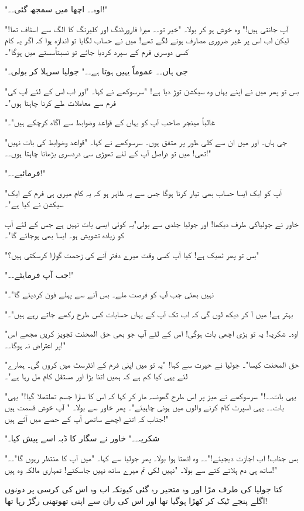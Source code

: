"اوہ۔۔ اچھا میں سمجھ گئی۔۔!"

"آپ جانتی ہیں!" وہ خوش ہو کر بولا۔ "خیر تو۔۔ میرا فارورڈنگ اور کلیرنگ کا الگ سے اسٹاف تھا! لیکن اب اس پر غیر ضروری مصارف ہونے لگے تھے! میں نے حساب لگایا تو اندازہ ہوا کہ اگر یہ کام کسی دوسری فرم کے سپرد کردیا جائے تو نسبتاًسستے میں ہوگا"۔

"جی ہاں۔۔ عموماً یہیں ہوتا ہے۔۔" جولیا سرہلا کر بولی۔

"بس تو پھر میں نے اپنے یہاں وہ سیکشن توڑ دیا ہے! "سرسوکھے نے کہا۔ "اور اب اس کے لئے آپ کی فرم سے معاملات طے کرنا چاہتا ہوں"۔

"غالباً مینجر صاحب آپ کو یہاں کے قواعد وضوابط سے آگاہ کرچکے ہیں"۔

"جی ہاں۔ اور میں ان سے کلی طور پر متفق ہوں۔ سرسوکھے نے کہا۔ "قواعد وضوابط کی بات نہیں تھی! میں تو دراصل آپ کے لئے تھوڑی سی دردسری بڑھانا چاہتا ہوں۔۔!"

"فرمائیے۔۔!"

"آپ کو ایک ایسا حساب بھی تیار کرنا ہوگا جس سے یہ ظاہر ہو کہ یہ کام میری ہی فرم کے ایک سیکشن نے کیا ہے"۔

خاور نے جولیاکی طرف دیکھا! اور جولیا جلدی سے بولی"یہ کوئی ایسی بات نہیں ہے جس کے لئے آپ کو زیادہ تشویش ہو۔ ایسا بھی ہوجائے گا"۔

"بس تو پھر ٹھیک ہے! کیا آپ کسی وقت میرے دفتر آنے کی زحمت گوارا کرسکتی ہیں؟"

"جب آپ فرمایئے۔۔!"

"نہیں بھئی جب آپ کو فرصت ملے۔ بس آنے سے پہلے فون کردیئے گا"۔

"بہتر ہے! میں آ کر دیکھ لوں گی کہ اب تک آپ کے یہاں حسابات کس طرح رکھے جاتے رہے ہیں"۔

"اوہ۔ شکریہ! یہ تو بڑی اچھی بات ہوگی! اس کے لئے آپ جو بھی حق المحنت تجویز کریں مجھے اس پر اعتراض نہ ہوگا۔۔!"

"حق المحنت کیسا"۔ جولیا نے حیرت سے کہا! "یہ تو میں اپنی فرم کے انٹرسٹ میں کروں گی۔ ہمارے لئے یہی کیا کم ہے کہ ہمیں اتنا بڑا اور مستقل کام مل رہا ہے"۔

"یہی بات۔۔!" سرسوکھے نے میز پر اس طرح گھونسہ مار کر کہا کہ اس کا سارا جسم تھلتھلا گیا!" یہی بات۔۔ یہی اسپرٹ کام کرنے والوں میں ہونی چاہیئے"۔ پھر خاور سے بولا۔ " آپ خوش قسمت ہیں جناب کہ اتنے اچھے ساتھی آپ کے حصے میں آئے ہیں!"

"شکریہ۔۔" خاور نے سگار کا ڈبہ اسے پیش کیا۔

"بس جناب! اب اجازت دیجیئے!"۔۔ وہ اٹھتا ہوا بولا۔ پھر جولیا سے کہا۔ "میں آپ کا منتظر رہوں گا"۔۔ ساتھ ہی دم ہلاتے کتے سے بولا۔ "نہیں لکی تم میرے ساتھ نہیں جاسکتے! تمہاری مالکہ وہ ہیں!"

کتا جولیا کی طرف مڑا اور وہ متحیر رہ گئی کیونکہ اب وہ اس کی کرسی پر دونوں اگلے پنجے ٹیک کر کھڑا ہوگیا تھا اور اس کی ران سے اپنی تھوتھنی رگڑ رہا تھا!

